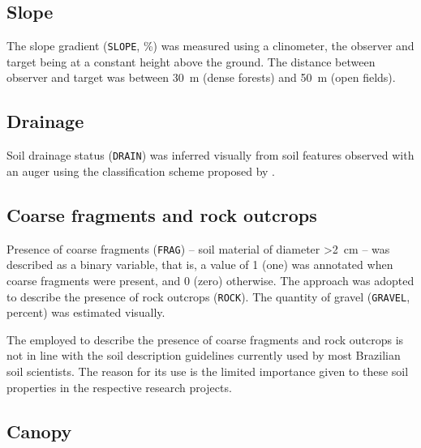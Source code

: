 
\tocless\subsection{Slope}

The slope gradient (\texttt{SLOPE}, \si{\percent}) was measured using a clinometer, the observer
and target being at a constant height above the ground. The distance between observer and target was 
between \SI{30}{\metre} (dense forests) and \SI{50}{\metre} (open fields).

\tocless\subsection{Drainage}

Soil drainage status (\texttt{DRAIN}) was inferred visually from soil features observed with an 
auger using the classification scheme proposed by .

\tocless\subsection{Coarse fragments and rock outcrops}

Presence of coarse fragments (\texttt{FRAG}) -- soil material of diameter \SI{>2}{\centi\metre} -- was described 
as a binary variable, that is, a value of \num{1} (one) was annotated when coarse fragments were present, and 
\num{0} (zero) otherwise. The approach was adopted to describe the presence of rock outcrops (\texttt{ROCK}). The 
quantity of gravel (\texttt{GRAVEL}, \si{percent}) was estimated visually.

The employed to describe the presence of coarse fragments and rock outcrops is not in line with the soil 
description guidelines currently used by most Brazilian soil scientists. The reason for its use is the limited 
importance given to these soil properties in the respective research projects.

\tocless\subsection{Canopy}

